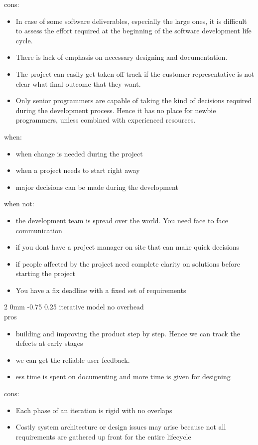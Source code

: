 \documentclass[a4paper,11pt]{article}
\makeatletter
\renewcommand{\subsection}{\@startsection
   {subsection}%
   {2}%
   {0mm}%
   {-0.75\baselineskip}%
   {0.25\baselineskip}%
   {\rmfamily\normalfont\slshape\normalsize}}%
\makeatother
\begin{document}
cons:
\begin{itemize}
\item In case of some software deliverables, especially the large ones, it is difficult to assess the effort required at the beginning of the software development life cycle.

\item There is lack of emphasis on necessary designing and documentation.
\item The project can easily get taken off track if the customer representative is not clear what final outcome that they want.
\item Only senior programmers are capable of taking the kind of decisions required during the development process. Hence it has no place for newbie programmers, unless combined with experienced resources.
\end{itemize}
when:
\begin{itemize}
\item when change is needed during the project
\item when a project needs to start right away
\item major decisions can be made during the development
\end{itemize}
when not:
\begin{itemize}
\item the development team is spread over the world. You need face to face communication
\item if you dont have a project manager on site that can make quick decisions
\item if people affected by the project need complete clarity on solutions before starting the project
\item You have a fix deadline with a fixed set of requirements
\end{itemize}
\subsection{iterative model}
no overhead
\\pros
\begin{itemize}
\item building and improving the product step by step. Hence we can track the defects at early stages
\item we can get the reliable user feedback.
\item ess time is spent on documenting and more time is given for designing
\end{itemize}
cons:
\begin{itemize}
\item Each phase of an iteration is rigid with no overlaps
\item Costly system architecture or design issues may arise because not all requirements are gathered up front for the entire lifecycle
\end{itemize}
\end{document}
